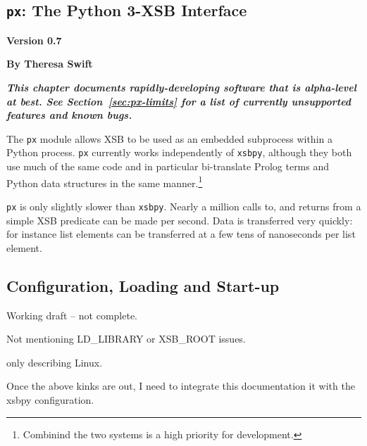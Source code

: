 
\newcommand{\pxversion}{Version 0.7}
\newcommand{\px}{{\tt px}}

\begin{center}
\chapter{\px{}: The Python 3-XSB Interface} \label{chap:px}
\end{center}

\vspace*{-.30in} 
\begin{center}
{\Large {\bf  \pxversion}}
\end{center}

\begin{center}
  {\Large {\bf By Theresa Swift}}
\end{center}

\noindent
{\large {\bf {\em This chapter documents rapidly-developing software
      that is alpha-level at best.  See Section~\ref{sec:px-limits}
      for a list of currently unsupported features and known bugs.}}}

The \px{} module allows XSB to be used as an embedded subprocess
within a Python process.  \px{} currently works independently of
{\tt xsbpy}, although they both use much of the same code and in
particular bi-translate Prolog terms and Python data structures in the
same manner.\footnote{Combinind the two systems is a high priority
  for development.}

\px{} is only slightly slower than {\tt xsbpy}.  Nearly a million
calls to, and returns from a simple XSB predicate can be made per
second.  Data is transferred very quickly: for instance list elements
can be transferred at a few tens of nanoseconds per list element.

\section{Configuration, Loading and Start-up} \label{px:config}

{\sc Working draft -- not complete.
  \bi
  \item Not mentioning LD\_LIBRARY or XSB\_ROOT issues.
  \item  only describing Linux.
  \item Once the above kinks are out, I need to integrate this
    documentation it with the xsbpy configuration.
    \ei
    }

